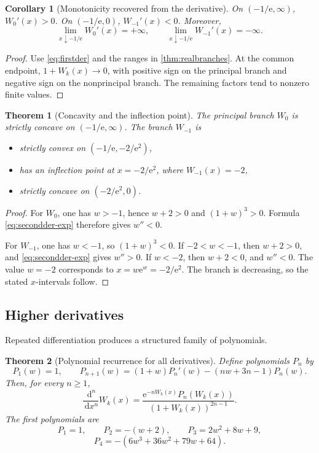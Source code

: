 \documentclass[11pt]{article}
\newtheorem{theorem}{Theorem}[section]
\newtheorem{corollary}[corollary]{Corollary}
\theoremstyle{remark}
\newcommand{\Wz}{W_0}
\newcommand{\Wm}{W_{-1}}
\newcommand{\ee}{\mathrm e}
\newcommand{\dd}{\,\mathrm d}
\begin{document}
\begin{corollary}[Monotonicity recovered from the derivative]
On \((-1/\ee,\infty)\), \(\Wz'(x)>0\).  On
\((-1/\ee,0)\), \(\Wm'(x)<0\).  Moreover,
\[
 \lim_{x\downarrow-1/\ee}\Wz'(x)=+\infty,\qquad
 \lim_{x\downarrow-1/\ee}\Wm'(x)=-\infty.
\]
\end{corollary}

\begin{proof}
Use \eqref{eq:firstder} and the ranges in
\cref{thm:realbranches}.  At the common endpoint, \(1+W_k(x)\to0\), with
positive sign on the principal branch and negative sign on the
nonprincipal branch.  The remaining factors tend to nonzero finite values.
\end{proof}

\begin{theorem}[Concavity and the inflection point]\label{thm:curvature}
The principal branch \(\Wz\) is strictly concave on
\((-1/\ee,\infty)\).  The branch \(\Wm\) is
\begin{itemize}
\item strictly convex on \((-1/\ee,-2/\ee^2)\),
\item has an inflection point at \(x=-2/\ee^2\), where \(\Wm(x)=-2\),
\item strictly concave on \((-2/\ee^2,0)\).
\end{itemize}
\end{theorem}

\begin{proof}
For \(\Wz\), one has \(w>-1\), hence \(w+2>0\) and
\((1+w)^3>0\).  Formula \eqref{eq:secondder-exp} therefore gives \(w''<0\).

For \(\Wm\), one has \(w<-1\), so \((1+w)^3<0\).  If \(-2<w<-1\), then
\(w+2>0\), and \eqref{eq:secondder-exp} gives \(w''>0\).  If \(w<-2\),
then \(w+2<0\), and \(w''<0\).  The value \(w=-2\) corresponds to
\(x=w\ee^w=-2/\ee^2\).  The branch is decreasing, so the stated
\(x\)-intervals follow.
\end{proof}

\subsection{Higher derivatives}

Repeated differentiation produces a structured family of polynomials.

\begin{theorem}[Polynomial recurrence for all derivatives]\label{thm:higherder}
Define polynomials \(P_n\) by
\[
 P_1(w)=1,\qquad
 P_{n+1}(w)=(1+w)P_n'(w)-(nw+3n-1)P_n(w).
\]
Then, for every \(n\geq1\),
\begin{equation}\label{eq:higherder}
 \frac{\dd^n}{\dd x^n}W_k(x)
 =\frac{\ee^{-nW_k(x)}P_n(W_k(x))}
        {(1+W_k(x))^{2n-1}}.
\end{equation}
The first polynomials are
\[
 P_1=1,\qquad P_2=-(w+2),\qquad
 P_3=2w^2+8w+9,
\]
\[
 P_4=-(6w^3+36w^2+79w+64).
\]
\end{theorem}
\end{document}
